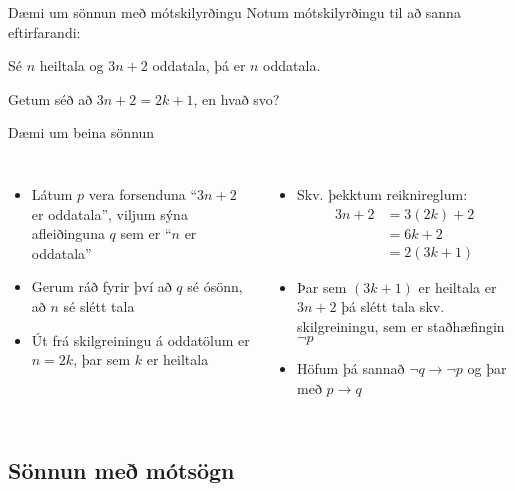 \documentclass{beamer}
\begin{document}
\begin{frame}{Dæmi um sönnun með mótskilyrðingu}
    Notum mótskilyrðingu til að sanna eftirfarandi:
    \begin{tcolorbox}
        Sé $n$ heiltala og $3n+2$ oddatala, þá er $n$ oddatala.
    \end{tcolorbox}
    Getum séð að $3n + 2 = 2k+1$, en hvað svo?
\end{frame}

\begin{frame}{Dæmi um beina sönnun}
    \begin{columns}
        \begin{itemize}[<+->]
            \item Látum $p$ vera forsenduna ``$3n+2$ er oddatala'', viljum sýna afleiðinguna $q$ sem er ``$n$ er oddatala''
            \item Gerum ráð fyrir því að $q$ sé ósönn, að $n$ sé slétt tala
            \item Út frá skilgreiningu á oddatölum er $n = 2k$, þar sem $k$ er heiltala
        \end{itemize}
        \begin{itemize}[<+->]
            \item Skv. þekktum reiknireglum:
            \begin{align*}
                3n+2 &= 3(2k)+2\\
                &=6k+2\\
                &=2(3k+1)
            \end{align*}
            \item Þar sem $(3k+1)$ er heiltala er $3n+2$ þá slétt tala skv. skilgreiningu, sem er staðhæfingin $\lnot p$
            \item Höfum þá sannað $\lnot q \to \lnot p$ og þar með $p \to q$
        \end{itemize}
    \end{columns}
\end{frame}

\subsection{Sönnun með mótsögn}
\end{document}
